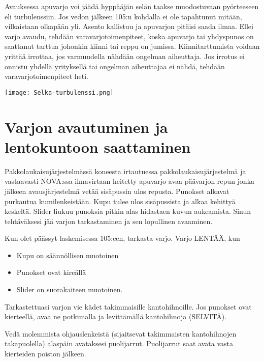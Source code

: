 \begin{multicols}{2}
Avauksessa apuvarjo voi jäädä hyppääjän selän taakse muodostuvaan pyörteeseen eli turbulenssiin. Jos vedon jälkeen 105:n kohdalla ei ole tapahtunut mitään, vilkaistaan olkapään yli. Asento kallistuu ja apuvarjon pitäisi saada ilmaa. Ellei varjo avaudu, tehdään varavarjotoimenpiteet, koska apuvarjo tai yhdyspunos on saattanut tarttua johonkin kiinni tai reppu on jumissa. Kiinnitarttumista voidaan yrittää irrottaa, jos varmuudella nähdään ongelman aiheuttaja. Jos irrotus ei onnistu yhdellä yrityksellä tai ongelman aiheuttajaa ei nähdä, tehdään varavarjotoimenpiteet heti. 


\begin{Figure}\centering\texttt{[image: Selka-turbulenssi.png]}\end{Figure} 

\section{ Varjon avautuminen ja lentokuntoon saattaminen }
\label{hyppytapahtuma-varjon-avautuminen-ja-lentokuntoon-saattaminen}


Pakkolaukaisujärjestelmässä koneesta irtautuessa pakkolaukaisujärjestelmä ja vastaavasti NOVA:ssa ilmavirtaan heitetty apuvarjo avaa päävarjon repun jonka jälkeen avausjärjestelmä vetää sisäpussin ulos repusta. Punokset alkavat purkautua kumilenkeistään. Kupu tulee ulos sisäpussista ja alkaa kehittyä keskeltä. Slider liukuu punoksia pitkin alas hidastaen kuvun aukeamista. Sinun tehtäväksesi jää varjon tarkastaminen ja sen lopullinen avaaminen. 


Kun olet päässyt laskemisessa 105:een, tarkasta varjo. Varjo LENTÄÄ, kun 

\begin{itemize}
\item  Kupu on säännöllisen muotoinen 
\item  Punokset ovat kireällä 
\item  Slider on suorakaiteen muotoinen. 
\end{itemize}

Tarkastettuasi varjon vie kädet takimmaisille kantohihnoille. Jos punokset ovat kierteellä, avaa ne potkimalla ja levittämällä kantohihnoja (SELVITÄ). 


Vedä molemmista ohjauslenkeistä (sijaitsevat takimmaisten kantohihnojen takapuolella) alaspäin avataksesi puolijarrut. Puolijarrut saat avata vasta kierteiden poiston jälkeen.  



\end{multicols}
